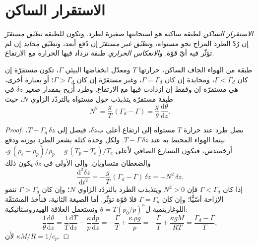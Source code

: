 \section{الاستقرار الساكن}\label{sec:b1:fluid-envelopes-structure:stability}

\begin{definition}\label{def:b1:fluid-envelopes-structure:stability}
\emph{الاستقرار الساكن} لطبقة ساكنة هو استجابتها  صغيرة لطرد. وتكون للطبقة \emph{تطبّق مستقرّ} إن رُدّ الطرد المزاح نحو مستواه، و\emph{تطبّق غير مستقرّ} إن دُفع أبعد، و\emph{تطبّق محايد} إن لم تؤثّر فيه أيّ قوّة. و\emph{الانعكاس الحراري} طبقة تزداد فيها الحرارة مع الارتفاع.
\end{definition}

\begin{theorem}\label{thm:b1:fluid-envelopes-structure:stability}
طبقة من الهواء الجاف الساكن، حرارتها $T$ ومعدّل انخفاضها البيئي $\Gamma$، تكون مستقرّة إن كان $\Gamma < \Gamma_d$، ومحايدة إن كان $\Gamma = \Gamma_d$، وغير مستقرّة إن كان $\Gamma > \Gamma_d$؛ أو بعبارة أخرى، هي مستقرّة إن وفقط إن ازدادت فيها  مع الارتفاع. وطرد أُزيح بمقدار صغير $\delta z$ في طبقة مستقرّة يتذبذب حول مستواه بالتردّد الزاوي $N$، حيث
\[
  N^2 = \frac{g}{T}\,(\Gamma_d - \Gamma) = \frac{g}{\theta}\,\frac{\mathrm d\theta}{\mathrm dz}.
\]
\end{theorem}

\begin{proof}
يصل طرد عند حرارة $T$ مستواه إلى ارتفاع أعلى ب$\delta z$، فيصل إلى $T - \Gamma_d\,\delta z$، بينما الهواء المحيط به عند $T - \Gamma\,\delta z$. ولكل وحدة كتلة يشعر الطرد بوزنه ودفع أرخميدس، فيكون التسارع الصافي لأعلى $g\,(\rho_e - \rho_p)/\rho_p = g\,(T_p - T_e)/T_e$، والضغطان متساويان. وإلى  الأولى في $\delta z$ يكون ذلك
\[
  \frac{\mathrm d^2 \delta z}{\mathrm dt^2} = -\frac{g}{T}\,(\Gamma_d - \Gamma)\,\delta z = -N^2\,\delta z .
\]
إذا كان $\Gamma < \Gamma_d$ فإن $N^2 > 0$ ويتذبذب الطرد بالتردّد الزاوي $N$؛ وإن كان $\Gamma > \Gamma_d$ تنمو الإزاحة أسّيًّا؛ وإن كان $\Gamma = \Gamma_d$ فلا قوّة تؤثّر. أما الصيغة الثانية، فنأخذ المشتقّة اللوغاريتمية ل$\theta = T (p_0/p)^{\kappa}$ ونستعمل العلاقة الهيدروستاتيكية:
\[
  \frac{1}{\theta}\frac{\mathrm d\theta}{\mathrm dz} = \frac{1}{T}\frac{\mathrm dT}{\mathrm dz}
  - \frac{\kappa}{p}\frac{\mathrm dp}{\mathrm dz} = -\frac{\Gamma}{T} + \frac{\kappa\,\rho g}{p}
  = -\frac{\Gamma}{T} + \frac{\kappa g M}{RT} = \frac{\Gamma_d - \Gamma}{T},
\]
لأن $\kappa M/R = 1/c_p$.
\end{proof}

